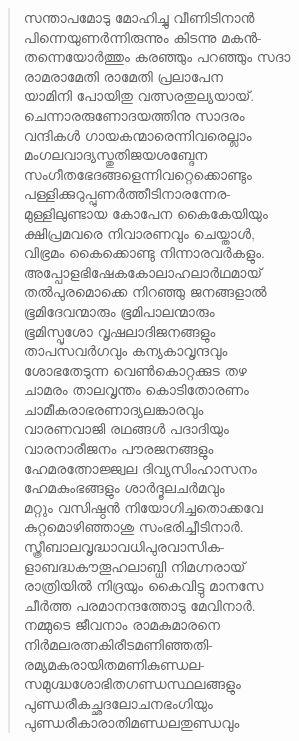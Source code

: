 \begin{verse}
സന്താപമോടു മോഹിച്ചു വീണിടിനാന്‍\\
പിന്നെയുണര്‍ന്നിരുന്നും കിടന്നു മകന്‍-\\
തന്നെയോര്‍ത്തും കരഞ്ഞും പറഞ്ഞും സദാ\\
രാമരാമേതി രാമേതി പ്രലാപേന\\
യാമിനി പോയിതു വത്സരതുല്യയായ്.\\
ചെന്നാരരുണോദയത്തിനു സാദരം\\
വന്ദികള്‍ ഗായകന്മാരെന്നിവരെല്ലാം\\
മംഗലവാദ്യസ്തുതിജയശബ്ദേന\\
സംഗീതഭേദങ്ങളെന്നിവറ്റെക്കൊണ്ടും\\
പള്ളിക്കുറുപ്പുണര്‍ത്തീടിനാരന്നേര-\\
മുള്ളിലുണ്ടായ കോപേന കൈകേയിയും\\
ക്ഷിപ്രമവരെ നിവാരണവും ചെയ്താള്‍,\\
വിഭ്രമം കൈക്കൊണ്ടു നിന്നാരവര്‍കളും.\\
അപ്പോളഭിഷേകകോലാഹലാര്‍ഥമായ്\\
തല്‍പുരമൊക്കെ നിറഞ്ഞു ജനങ്ങളാല്‍\\
ഭൂമിദേവന്മാരും ഭൂമിപാലന്മാരും\\
ഭൂമിസ്പൃശോ വൃഷലാദിജനങ്ങളും\\
താപസവര്‍ഗവും കന്യകാവൃന്ദവും\\
ശോഭതേടുന്ന വെണ്‍കൊറ്റക്കുട തഴ\\
ചാമരം താലവൃന്തം കൊടിതോരണം\\
ചാമീകരാഭരണാദ്യലങ്കാരവും\\
വാരണവാജി രഥങ്ങള്‍ പദാദിയും\\
വാരനാരീജനം പൗരജനങ്ങളും\\
ഹേമരത്നോജ്ജ്വല ദിവ്യസിംഹാസനം\\
ഹേമകുംഭങ്ങളും ശാര്‍ദ്ദൂലചര്‍മവും\\
മറ്റും വസിഷ്ഠന്‍ നിയോഗിച്ചതൊക്കവേ\\
കുറ്റമൊഴിഞ്ഞാശു സംഭരിച്ചീടിനാര്‍.\\
സ്ത്രീബാലവൃദ്ധാവധിപുരവാസിക-\\
ളാബദ്ധകൗതൂഹലാബ്ധി നിമഗ്നരായ്\\
രാത്രിയില്‍ നിദ്രയും കൈവിട്ടു മാനസേ\\
ചീര്‍ത്ത പരമാനന്ദത്തോടു മേവിനാര്‍.\\
നമ്മുടെ ജീവനാം രാമകുമാരനെ\\
നിര്‍മലരത്നകിരീടമണിഞ്ഞതി-\\
രമ്യമകരായിതമണികുണ്ഡല-\\
സമുഗ്ദ്ധശോഭിതഗണ്ഡസ്ഥലങ്ങളും\\
പുണ്ഡരീകച്ഛദലോചനഭംഗിയും\\
പുണ്ഡരീകാരാതിമണ്ഡലതുണ്ഡവും\\

\end{verse}
